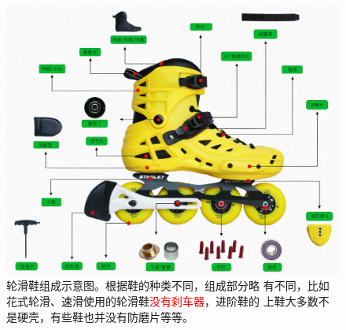 \documentclass[12pt]{ctexart}
\begin{document}
\begin{figure}[htpb]
  \centering
  \includegraphics[width=\textwidth]{all.jpg}
  \caption{轮滑鞋组成示意图\cite{zhihu:skating1}。根据鞋的种类不同，组成部分略
  有不同，比如花式轮滑、速滑使用的轮滑鞋\textcolor{red}{没有刹车器}，进阶鞋的
上鞋大多数不是硬壳，有些鞋也并没有防磨片等等。}
\end{figure}
\clearpage
\end{document}
